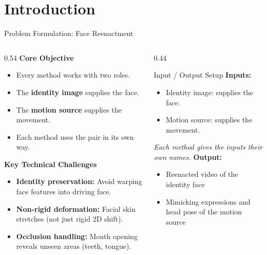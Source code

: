 \section{Introduction}

\begin{frame}{Problem Formulation: Face Reenactment}
    \begin{columns}[c]
        \begin{column}{0.54\textwidth}
            \small
            \textbf{Core Objective}
            \begin{itemize}
                \item Every method works with two roles.
                \item The \textbf{identity image} supplies the face.
                \item The \textbf{motion source} supplies the movement.
                \item Each method uses the pair in its own way.
            \end{itemize}

            \vspace{0.15cm}
            \textbf{Key Technical Challenges}
            \begin{itemize}
                \item \textbf{Identity preservation:} Avoid warping face features into driving face.
                \item \textbf{Non-rigid deformation:} Facial skin stretches (not just rigid 2D shift).
                \item \textbf{Occlusion handling:} Mouth opening reveals unseen areas (teeth, tongue).
            \end{itemize}
        \end{column}

        \begin{column}{0.44\textwidth}
            \begin{block}{Input / Output Setup}
                \small
                \textbf{Inputs:}
                \begin{itemize}
                    \item Identity image: supplies the face.
                    \item Motion source: supplies the movement.
                \end{itemize}
                \vspace{0.1cm}
                \textit{Each method gives the inputs their own names.}
                \vspace{0.1cm}
                \textbf{Output:}
                \begin{itemize}
                    \item Reenacted video of the identity face
                    \item Mimicking expressions and head pose of the motion source
                \end{itemize}
            \end{block}
        \end{column}
    \end{columns}
\end{frame}
